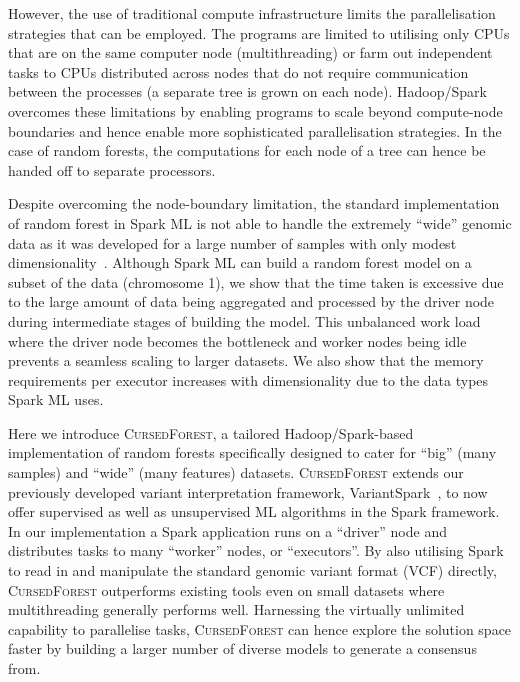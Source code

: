 \documentclass[10pt,letterpaper]{article}
\newcommand{\cursedforest}{\textsc{CursedForest}\xspace}
\begin{document}
However, the use of traditional compute infrastructure limits the parallelisation strategies that can be employed.  
The programs are limited to utilising only CPUs that are on the same computer node (multithreading) or
farm out independent tasks to CPUs distributed across nodes that do not require communication between the
processes (a separate tree is grown on each node).
Hadoop/Spark overcomes these limitations by enabling programs to
scale beyond compute-node boundaries and hence enable more sophisticated parallelisation strategies.  In the case of
random forests, the computations for each node of a tree can hence be handed off to separate processors.
 
Despite overcoming the node-boundary limitation, the standard implementation of random forest in Spark ML
is not able to handle the extremely ``wide'' genomic data as it was developed for a large number of samples
with only modest dimensionality~\cite{NIPS2016_6366}.  Although Spark ML can build a random forest model on a subset of the data (chromosome
1), we show that the time taken is excessive due to the large amount of data being aggregated and processed by the driver node during
intermediate stages of building the model.  This unbalanced work load where the driver
node becomes the bottleneck and worker nodes being idle prevents a seamless scaling to larger datasets. We also show that the memory
requirements per executor increases with dimensionality due to the data types Spark ML uses.%
  
Here we introduce \cursedforest, a tailored Hadoop/Spark-based implementation of random forests specifically designed to cater
for ``big'' (many samples) and ``wide'' (many features) datasets. 
\cursedforest extends our previously developed variant interpretation framework, VariantSpark~\cite{OBrien2015}, to now offer
supervised as well as unsupervised ML algorithms in the Spark framework.
In our implementation a Spark application runs on a ``driver'' node and
distributes tasks to many ``worker'' nodes, or ``executors''. 
By also utilising Spark to read in and manipulate the standard genomic variant format (VCF)
directly, \cursedforest outperforms existing tools even on small datasets where multithreading generally performs
well. Harnessing the virtually unlimited capability to parallelise tasks, \cursedforest can hence explore the solution 
space faster by building a larger number of diverse models to generate a consensus from. 
\end{document}
